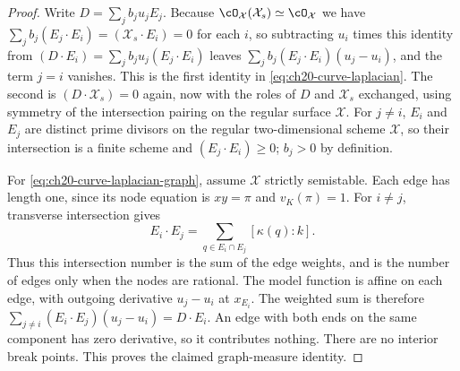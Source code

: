 \begin{proof}
Write $D=\sum_jb_ju_jE_j$.  Because
$\cO_{\mathcal X}(\mathcal X_s)\simeq\cO_{\mathcal X}$ we have
$\sum_jb_j(E_j\cdot E_i)=(\mathcal X_s\cdot E_i)=0$ for each $i$, so
subtracting $u_i$ times this identity from
$(D\cdot E_i)=\sum_jb_ju_j(E_j\cdot E_i)$ leaves
$\sum_{j}b_j(E_j\cdot E_i)(u_j-u_i)$, and the term $j=i$ vanishes.  This
is the first identity in \eqref{eq:ch20-curve-laplacian}.  The second is
$(D\cdot\mathcal X_s)=0$ again, now with the roles of $D$ and
$\mathcal X_s$ exchanged, using symmetry of the intersection pairing on
the regular surface $\mathcal X$.  For $j\neq i$, $E_i$ and $E_j$
are distinct prime divisors on the regular two-dimensional scheme
$\mathcal X$, so their intersection is a finite scheme and
$(E_j\cdot E_i)\geq0$; $b_j>0$ by definition.

For \eqref{eq:ch20-curve-laplacian-graph}, assume
$\mathcal X$ strictly semistable.  Each edge has length one, since its
node equation is $xy=\pi$ and $v_K(\pi)=1$.
For $i\ne j$, transverse intersection gives
\[
            E_i\cdot E_j
                 =\sum_{q\in E_i\cap E_j}[\kappa(q):k].
\]
Thus this intersection number is the sum of the edge weights,
and is the number of edges only when the nodes are rational.
The model function is affine on each edge, with outgoing
derivative $u_j-u_i$ at $x_{E_i}$.
The weighted sum is therefore
$\sum_{j\ne i}(E_i\cdot E_j)(u_j-u_i)=D\cdot E_i$.
An edge with both ends on the same component has zero derivative,
so it contributes nothing.  There are no interior break points.
This proves the claimed graph-measure identity.
\end{proof}

